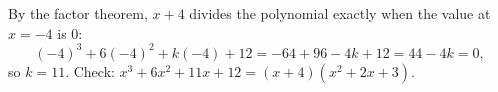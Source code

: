 By the factor theorem, $x+4$ divides the polynomial exactly when the value at $x=-4$ is $0$:
\[
(-4)^3+6(-4)^2+k(-4)+12=-64+96-4k+12=44-4k=0,
\]
so $k=\boxed{11}$. Check: $x^3+6x^2+11x+12=(x+4)(x^2+2x+3)$.
